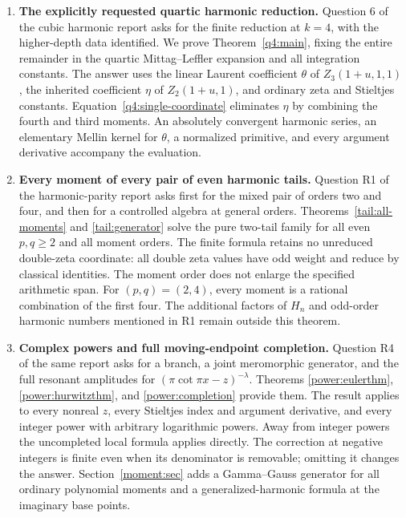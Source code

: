 \documentclass[11pt,a4paper]{article}
\numberwithin{equation}{section}
\theoremstyle{definition}
\theoremstyle{remark}
\begin{document}
\begin{enumerate}
\item \textbf{The explicitly requested quartic harmonic reduction.}
Question 6 of the cubic harmonic report asks for the finite reduction
at $k=4$, with the higher-depth data identified. We prove
Theorem~\ref{q4:main}, fixing the entire remainder in the quartic
Mittag--Leffler expansion and all integration constants. The answer
uses the linear Laurent coefficient $\theta$ of $Z_3(1+u,1,1)$,
the inherited coefficient $\eta$ of $Z_2(1+u,1)$, and ordinary
zeta and Stieltjes constants. Equation~\eqref{q4:single-coordinate}
eliminates $\eta$ by combining the fourth and third moments.
An absolutely convergent harmonic series, an elementary Mellin
kernel for $\theta$, a normalized primitive, and every argument
derivative accompany the evaluation.

\item \textbf{Every moment of every pair of even harmonic tails.}
Question R1 of the harmonic-parity report asks first for the mixed
pair of orders two and four, and then for a controlled algebra at
general orders. Theorems~\ref{tail:all-moments} and
\ref{tail:generator} solve the pure two-tail family for all even
$p,q\ge2$ and all moment orders. The finite formula retains no
unreduced double-zeta coordinate: all double zeta values have odd
weight and reduce by classical identities. The moment order does
not enlarge the specified arithmetic span. For $(p,q)=(2,4)$,
every moment is a rational combination of the first four. The
additional factors of $H_n$ and odd-order harmonic numbers mentioned
in R1 remain outside this theorem.

\item \textbf{Complex powers and full moving-endpoint completion.}
Question R4 of the same report asks for a branch, a joint
meromorphic generator, and the full resonant amplitudes for
$(\pi\cot\pi x-z)^{-\lambda}$. Theorems
\ref{power:eulerthm}, \ref{power:hurwitzthm}, and
\ref{power:completion} provide them. The result applies to every
nonreal $z$, every Stieltjes index and argument derivative, and
every integer power with arbitrary logarithmic powers. Away from
integer powers the uncompleted local formula applies directly.
The correction at negative integers is finite even when its
denominator is removable; omitting it changes the answer.
Section~\ref{moment:sec} adds a Gamma--Gauss generator for all
ordinary polynomial moments and a generalized-harmonic formula
at the imaginary base points.
\end{enumerate}
\end{document}
